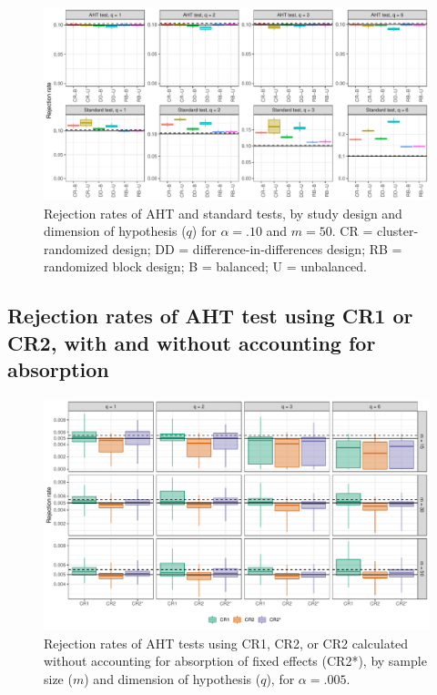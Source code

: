 \documentclass[12pt]{article}
\begin{document}
\begin{landscape}
\begin{figure}[p]
{\centering \includegraphics[width=\linewidth]{CR_fig/balance_10_50-1} 

}

\caption{Rejection rates of AHT and standard tests, by study design and dimension of hypothesis ($q$) for $\alpha = .10$ and $m = 50$. CR = cluster-randomized design; DD = difference-in-differences design; RB = randomized block design; B = balanced; U = unbalanced.}\label{fig:balance_10_50}
\end{figure}

\subsection{Rejection rates of AHT test using CR1 or CR2, with and without accounting for absorption}

\begin{figure}[p]

{\centering \includegraphics[width=\linewidth]{CR_fig/absorption_005-1} 

}

\caption{Rejection rates of AHT tests using CR1, CR2, or CR2 calculated without accounting for absorption of fixed effects (CR2*), by sample size ($m$) and dimension of hypothesis ($q$), for $\alpha = .005$.}\label{fig:absorption_005}
\end{figure}


\end{landscape}
\end{document}

